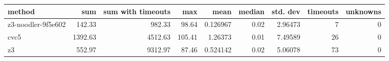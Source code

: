 \begin{tabular}{lrrrrrrrr}
\hline
 method             &     sum &   sum with timeouts &    max &     mean &   median &   std. dev &   timeouts &   unknowns \\
\hline
 z3-noodler-9f5e602 &  142.33 &              982.33 &  98.64 & 0.126967 &     0.02 &    2.96473 &          7 &          0 \\
 cvc5               & 1392.63 &             4512.63 & 105.41 & 1.26373  &     0.01 &    7.49589 &         26 &          0 \\
 z3                 &  552.97 &             9312.97 &  87.46 & 0.524142 &     0.02 &    5.06078 &         73 &          0 \\
\hline
\end{tabular}
